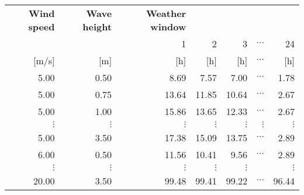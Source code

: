 \begin{table}
\label{tab:proba}
\begin{tabular}{rrrrrrr}

{\bf Wind speed} & {\bf Wave height} & {\bf Weather window} &            &            &            &            \\

           &            &          1 &          2 &          3 &  $\cdots$ &         24 \\

     [m/s] &        [m] &        [h] &        [h] &        [h] &  $\cdots$ &        [h] \\

      5.00 &       0.50 &       8.69 &       7.57 &       7.00 &  $\cdots$ &       1.78 \\

      5.00 &       0.75 &      13.64 &      11.85 &      10.64 &  $\cdots$ &       2.67 \\

      5.00 &       1.00 &      15.86 &      13.65 &      12.33 &  $\cdots$ &       2.67 \\

 $\vdots$ &  $\vdots$ &  $\vdots$ &  $\vdots$ &  $\vdots$ &  $\vdots$ &  $\vdots$ \\

      5.00 &       3.50 &      17.38 &      15.09 &      13.75 &  $\cdots$ &       2.89 \\

      6.00 &       0.50 &      11.56 &      10.41 &       9.56 &  $\cdots$ &       2.89 \\

 $\vdots$ &  $\vdots$ &  $\vdots$ &  $\vdots$ &  $\vdots$ &            &  $\vdots$ \\

     20.00 &       3.50 &      99.48 &      99.41 &      99.22 &  $\cdots$ &      96.44 \\

\end{tabular}  


\end{table}